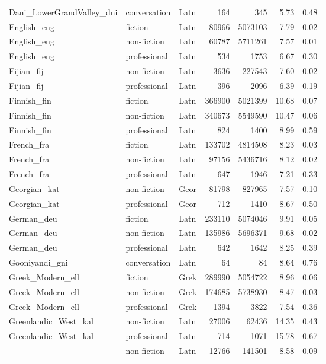 \begin{longtable}{lllrrrr}
  Dani\_LowerGrandValley\_dni & conversation & Latn & 164 & 345 & 5.73 & 0.48 \\ 
  English\_eng & fiction & Latn & 80966 & 5073103 & 7.79 & 0.02 \\ 
  English\_eng & non-fiction & Latn & 60787 & 5711261 & 7.57 & 0.01 \\ 
  English\_eng & professional & Latn & 534 & 1753 & 6.67 & 0.30 \\ 
  Fijian\_fij & non-fiction & Latn & 3636 & 227543 & 7.60 & 0.02 \\ 
  Fijian\_fij & professional & Latn & 396 & 2096 & 6.39 & 0.19 \\ 
  Finnish\_fin & fiction & Latn & 366900 & 5021399 & 10.68 & 0.07 \\ 
  Finnish\_fin & non-fiction & Latn & 340673 & 5549590 & 10.47 & 0.06 \\ 
  Finnish\_fin & professional & Latn & 824 & 1400 & 8.99 & 0.59 \\ 
  French\_fra & fiction & Latn & 133702 & 4814508 & 8.23 & 0.03 \\ 
  French\_fra & non-fiction & Latn & 97156 & 5436716 & 8.12 & 0.02 \\ 
  French\_fra & professional & Latn & 647 & 1946 & 7.21 & 0.33 \\ 
  Georgian\_kat & non-fiction & Geor & 81798 & 827965 & 7.57 & 0.10 \\ 
  Georgian\_kat & professional & Geor & 712 & 1410 & 8.67 & 0.50 \\ 
  German\_deu & fiction & Latn & 233110 & 5074046 & 9.91 & 0.05 \\ 
  German\_deu & non-fiction & Latn & 135986 & 5696371 & 9.68 & 0.02 \\ 
  German\_deu & professional & Latn & 642 & 1642 & 8.25 & 0.39 \\ 
  Gooniyandi\_gni & conversation & Latn & 64 & 84 & 8.64 & 0.76 \\ 
  Greek\_Modern\_ell & fiction & Grek & 289990 & 5054722 & 8.96 & 0.06 \\ 
  Greek\_Modern\_ell & non-fiction & Grek & 174685 & 5738930 & 8.47 & 0.03 \\ 
  Greek\_Modern\_ell & professional & Grek & 1394 & 3822 & 7.54 & 0.36 \\ 
  Greenlandic\_West\_kal & non-fiction & Latn & 27006 & 62436 & 14.35 & 0.43 \\ 
  Greenlandic\_West\_kal & professional & Latn & 714 & 1071 & 15.78 & 0.67 \\ 
   & non-fiction & Latn & 12766 & 141501 & 8.58 & 0.09 \\ 

\end{longtable}
